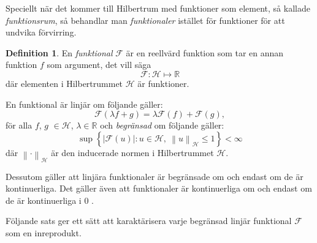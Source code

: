 \documentclass[a4paper, 12pt]{report}
\theoremstyle{definition}
\newtheorem{defi}{Definition}[section]
\theoremstyle{remark}
\begin{document}

Speciellt när det kommer till Hilbertrum med funktioner som element, så kallade \emph{funktionsrum}, så behandlar man \emph{funktionaler} istället för funktioner för att undvika förvirring.
\begin{defi}
	En \emph{funktional} $\mathcal{F}$ är en reellvärd funktion som tar en annan funktion $f$ som argument, det vill säga
	\begin{equation*}
		\mathcal{F}: \mathcal{H} \longmapsto \mathbb{R}
	\end{equation*}
	där elementen i Hilbertrummet $\mathcal{H}$ är funktioner.
\end{defi}

En funktional är linjär om följande gäller:
\begin{equation*}
	\mathcal{F}\left(\lambda f+g\right) = \lambda\mathcal{F}\left(f\right) + \mathcal{F}\left(g\right),
\end{equation*}
för alla $f$, $g$ $\in \mathcal{H}$, $\lambda \in \mathbb{R}$ och \emph{begränsad} om följande gäller:
\begin{equation*}
	\sup \left\{\left| \mathcal{F}\left(u\right) \right| : u\in\mathcal{H},~\left\| u \right\|_{\mathcal{H}} \leq 1 \right\} < \infty
\end{equation*}
där $\left\| \cdot \right\|_ \mathcal{H}$ är den inducerade normen i Hilbertrummet $\mathcal{H}$.

Dessutom gäller att linjära funktionaler är begränsade om och endast om de är kontinuerliga. Det gäller även att funktionaler är kontinuerliga om och endast om de är kontinuerliga i 0 \cite{Young}.

Följande sats ger ett sätt att karaktärisera varje begränsad linjär funktional $\mathcal{F}$ som en inreprodukt.
\end{document}
